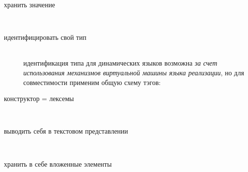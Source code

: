 \secdown


\begin{description}

\item[хранить значение]\ \\
\noindent{}

\item[идентифицировать свой тип]\ \\
идентификация типа для динамических языков возможна \emph{за счет использования
механизмов виртуальной машины языка реализации}, но для совместимости применим
общую схему тэгов:
\noindent{}

\item[конструктор = лексемы]\ \\
\noindent{}

\item[выводить себя в текстовом представлении]\ \\
\noindent{}

\item[хранить в себе вложенные элементы]\ \\
\noindent{}

\end{description}

\secup